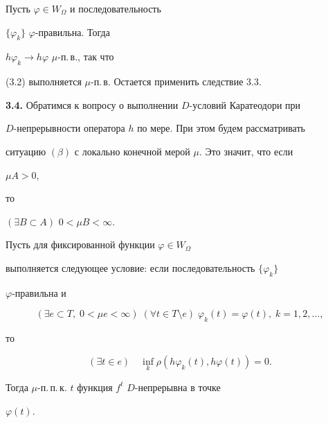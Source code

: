 \begin{pf} Пусть $\varphi\in W_\Omega$ и последовательность


$\{\varphi_k\}$ \; $\varphi$-правильна. Тогда


$h\varphi_k\to h\varphi$ \; $\mu$-п.\,в., так что


(3.2) выполняется $\mu$-п.\,в. Остается применить следствие 3.3.


\end{pf}





{\bf 3.4.} Обратимся к вопросу о выполнении $D$-условий Каратеодори при


$D$-непрерывности оператора $h$ по мере. При этом будем рассматривать


ситуацию $(\beta)$ с локально конечной мерой $\mu$. Это значит, что если


$\mu A>0$,


то


$(\exists B\subset A)$ \; $0<\mu B<\infty$.





\begin{lems} Пусть для фиксированной функции $\varphi\in W_\Omega$


выполняется следующее условие: если последовательность $\{\varphi_k\}$\;


$\varphi$-правильна и


%


\begin{equation}


(\exists e\subset T, \; 0<\mu e<\infty) \;


(\forall t\in T\setminus e) \;


\varphi_k(t)=\varphi (t), \; k=1,2,\dotsc,


\end{equation}


%


то


%


\begin{equation}


(\exists t\in e) \quad \inf_k\rho(h \varphi_k(t),h\varphi(t))=0.


\end{equation}


%


Тогда $\mu$-п.\,п.\,к. $t$ функция $f^t$ \; $D$-непрерывна в точке


$\varphi(t)$.


\end{lems}





